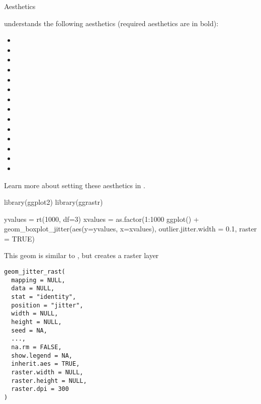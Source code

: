 \documentclass[a4paper]{book}
\begin{document}
\begin{Section}{Aesthetics}


 understands the following aesthetics (required aesthetics are in bold):
\begin{itemize}

\item{} 
\item{} 
\item{} 
\item{} 
\item{} 
\item{} 
\item{} 
\item{} 
\item{} 
\item{} 
\item{} 
\item{} 
\item{} 
\item{} 

\end{itemize}

Learn more about setting these aesthetics in .

\end{Section}
%
\begin{Examples}
\begin{ExampleCode}
library(ggplot2)
library(ggrastr)

yvalues = rt(1000, df=3)
xvalues = as.factor(1:1000 %
ggplot() + geom_boxplot_jitter(aes(y=yvalues, x=xvalues), outlier.jitter.width = 0.1, raster = TRUE)

\end{ExampleCode}
\end{Examples}
%
\begin{Description}\relax
This geom is similar to , but creates a raster layer
\end{Description}
%
\begin{Usage}
\begin{verbatim}
geom_jitter_rast(
  mapping = NULL,
  data = NULL,
  stat = "identity",
  position = "jitter",
  width = NULL,
  height = NULL,
  seed = NA,
  ...,
  na.rm = FALSE,
  show.legend = NA,
  inherit.aes = TRUE,
  raster.width = NULL,
  raster.height = NULL,
  raster.dpi = 300
)
\end{verbatim}
\end{Usage}
\end{document}
